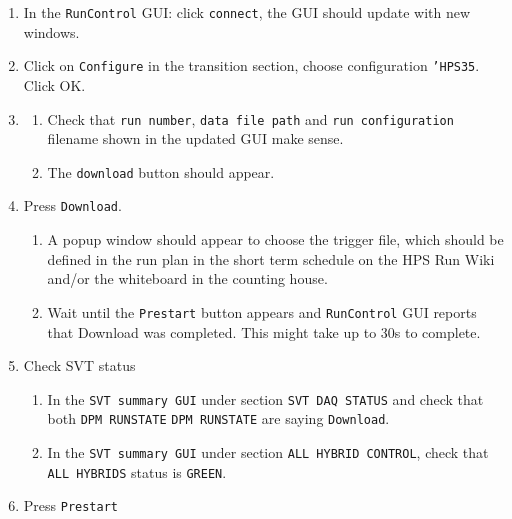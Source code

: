 \documentclass[12pt]{article}
\begin{document}
\begin{enumerate}
\item
In the \texttt{RunControl} GUI: click \texttt{connect}, the GUI should update with new windows. 

\item
Click on \texttt{Configure} in the transition section, choose configuration \texttt{'HPS35}. Click OK.
\item
\begin{enumerate}
\item
Check that \texttt{run number}, \texttt{data file path} and \texttt{run configuration} filename shown in the updated GUI make sense. 
\item
The \texttt{download} button should appear. 
\end{enumerate}


\item
\label{item:download}
Press \texttt{Download}.

\begin{enumerate}

\item
A popup window should appear to choose the trigger file, which should be defined in the run plan in the short term schedule on the HPS Run Wiki and/or the whiteboard in the counting house.

\item
Wait until the \texttt{Prestart} button appears and  \texttt{RunControl} GUI reports that Download was completed.\newline 
This might take up to 30s to complete.

\end{enumerate}

\item
Check SVT status

\begin{enumerate}

\item
In the \texttt{SVT summary GUI} under section \texttt{SVT DAQ STATUS} and check that both \texttt{DPM RUNSTATE}  \texttt{DPM RUNSTATE}  are saying \texttt{Download}.

\item
In the \texttt{SVT summary GUI} under section \texttt{ALL HYBRID CONTROL}, check that \texttt{ALL HYBRIDS} status is \texttt{GREEN}.

\end{enumerate}

\item
\label{item:prestart}
Press \texttt{Prestart} 


\end{enumerate}
\end{document}
